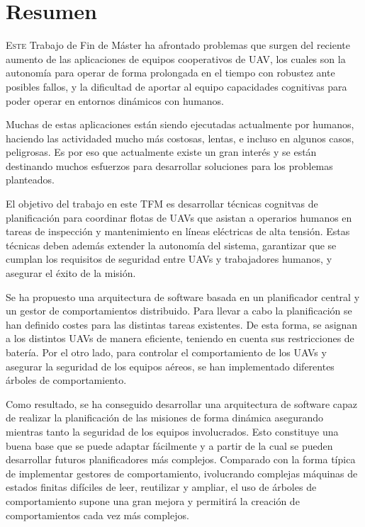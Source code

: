 \chapter*{Resumen}
\pagestyle{especial}
{}
\lettrine[lraise=-0.1, lines=2, loversize=0.2]{E}{ste} Trabajo de Fin de Máster ha afrontado problemas que surgen del reciente aumento de las aplicaciones de equipos cooperativos de \gls{UAV}, los cuales son la autonomía para operar de forma prolongada en el tiempo con robustez ante posibles fallos, y la dificultad de aportar al equipo capacidades cognitivas para poder operar en entornos dinámicos con humanos. 

Muchas de estas aplicaciones están siendo ejecutadas actualmente por humanos, haciendo las actividaded mucho más costosas, lentas, e incluso en algunos casos, peligrosas. Es por eso que actualmente existe un gran interés y se están destinando muchos esfuerzos para desarrollar soluciones para los problemas planteados.

El objetivo del trabajo en este TFM es desarrollar técnicas cognitvas de planificación para coordinar flotas de UAVs que asistan a operarios humanos en tareas de inspección y mantenimiento en líneas eléctricas de alta tensión. Estas técnicas deben además extender la autonomía del sistema, garantizar que se cumplan los requisitos de seguridad entre UAVs y trabajadores humanos, y asegurar el éxito de la misión.

Se ha propuesto una arquitectura de software basada en un planificador central y un gestor de comportamientos distribuido. Para llevar a cabo la planificación se han definido costes para las distintas tareas existentes. De esta forma, se asignan a los distintos UAVs de manera eficiente, teniendo en cuenta sus restricciones de batería. Por el otro lado, para controlar el comportamiento de los UAVs y asegurar la seguridad de los equipos aéreos, se han implementado diferentes árboles de comportamiento.

Como resultado, se ha conseguido desarrollar una arquitectura de software capaz de realizar la planificación de las misiones de forma dinámica asegurando mientras tanto la seguridad de los equipos involucrados. Esto constituye una buena base que se puede adaptar fácilmente y a partir de la cual se pueden desarrollar futuros planificadores más complejos. Comparado con la forma típica de implementar gestores de comportamiento, ivolucrando complejas máquinas de estados finitas difíciles de leer, reutilizar y ampliar, el uso de árboles de comportamiento supone una gran mejora y permitirá la creación de comportamientos cada vez más complejos.
